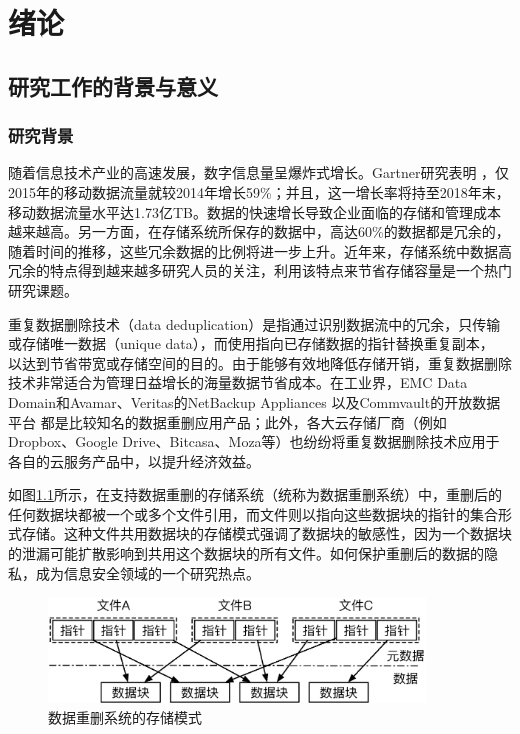 \chapter{绪\hspace{6pt}论}

\section{研究工作的背景与意义}
\subsection{研究背景}

随着信息技术产业的高速发展，数字信息量呈爆炸式增长。Gartner研究表明 ，仅2015年的移动数据流量就较2014年增长59\%；并且，这一增长率将持至2018年末，移动数据流量水平达1.73亿TB。数据的快速增长导致企业面临的存储和管理成本越来越高。另一方面，在存储系统所保存的数据中，高达60\%的数据都是冗余的，随着时间的推移，这些冗余数据的比例将进一步上升。近年来，存储系统中数据高冗余的特点得到越来越多研究人员的关注，利用该特点来节省存储容量是一个热门研究课题。

重复数据删除技术（data deduplication）是指通过识别数据流中的冗余，只传输或存储唯一数据（unique data），而使用指向已存储数据的指针替换重复副本， 以达到节省带宽或存储空间的目的。由于能够有效地降低存储开销，重复数据删除技术非常适合为管理日益增长的海量数据节省成本。在工业界，EMC Data Domain和Avamar、Veritas的NetBackup Appliances 以及Commvault的开放数据平台 都是比较知名的数据重删应用产品；此外，各大云存储厂商（例如 Dropbox、Google Drive、Bitcasa、Moza等）也纷纷将重复数据删除技术应用于各自的云服务产品中，以提升经济效益。

如图\ref{fig:数据重删系统的存储模式}所示，在支持数据重删的存储系统（统称为数据重删系统）中，重删后的任何数据块都被一个或多个文件引用，而文件则以指向这些数据块的指针的集合形式存储。这种文件共用数据块的存储模式强调了数据块的敏感性，因为一个数据块的泄漏可能扩散影响到共用这个数据块的所有文件。如何保护重删后的数据的隐私，成为信息安全领域的一个研究热点。

\begin{figure}[!htb]
    \small
    \centering
    \includegraphics[width=10cm]{pic/DedupSystemStorageMode.eps}
    \caption{数据重删系统的存储模式} 
    \label{fig:数据重删系统的存储模式}
\end{figure}

